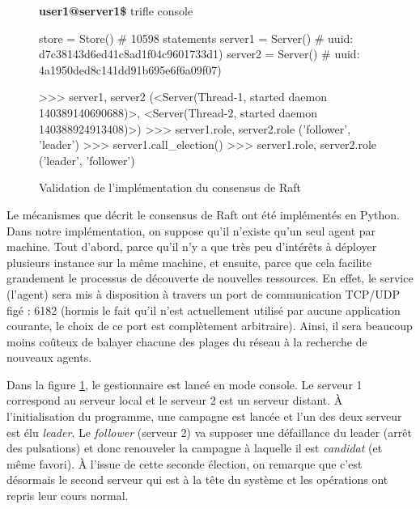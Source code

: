 \begin{figure}[h]

    \scriptsize
    \begin{myverbatim}[commandchars=\\\{\},codes={\catcode`$=3\catcode`_=8}]
\textbf{user1@server1\$} trifle console

store   = Store()  # 10598 statements
server1 = Server() # uuid: d7c38143d6ed41c8ad1f04c9601733d1)
server2 = Server() # uuid: 4a1950ded8c141dd91b695e6f6a09f07)

>>> server1, server2
(<Server(Thread-1, started daemon 140389140690688)>, 
 <Server(Thread-2, started daemon 140388924913408)>)
>>> server1.role, server2.role
('follower', 'leader')
>>> server1.call\_election()
>>> server1.role, server2.role
('leader', 'follower')
    \end{myverbatim}
  \caption{Validation de l'implémentation du consensus de Raft}
  \label{fig:raft}
\end{figure}

Le mécanismes que décrit le consensus de Raft ont été implémentés en Python.
Dans notre implémentation, on suppose qu'il n'existe qu'un seul agent par
machine. Tout d'abord, parce qu'il n'y a que très peu d'intérêts à déployer
plusieurs instance sur la même machine, et ensuite, parce que cela facilite
grandement le processus de découverte de nouvelles ressources. En effet, le
service (l'agent) sera mis à disposition à travers un port de communication
TCP/UDP figé : 6182 (hormis le fait qu'il n'est actuellement utilisé par aucune
application courante, le choix de ce port est complètement arbitraire). Ainsi,
il sera beaucoup moins coûteux de balayer chacune des plages du réseau à la
recherche de nouveaux agents.

Dans la figure \ref{fig:raft}, le gestionnaire est lancé en mode console. Le
serveur 1 correspond au serveur local et le serveur 2 est un serveur distant. À
l'initialisation du programme, une campagne est lancée et l'un des deux serveur
est élu \emph{leader}. Le \emph{follower} (serveur 2) va supposer une
défaillance du leader (arrêt des pulsations) et donc renouveler la campagne à
laquelle il est \emph{candidat} (et même favori). À l'issue de cette seconde
élection, on remarque que c'est désormais le second serveur qui est à la tête du
système et les opérations ont repris leur cours normal.

